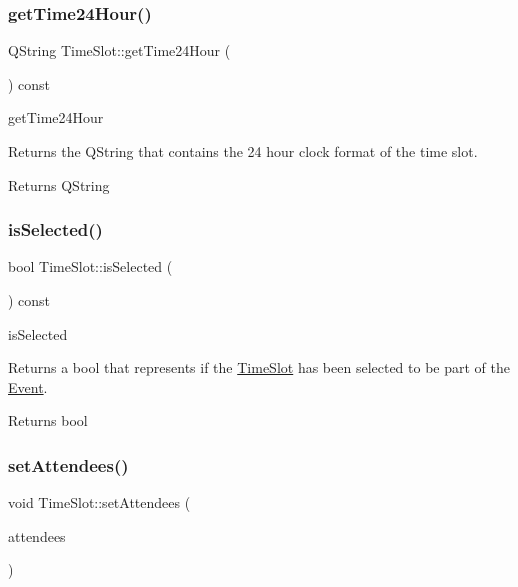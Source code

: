 \subsubsection{\texorpdfstring{get\+Time24\+Hour()}{getTime24Hour()}}
{\footnotesize\ttfamily Q\+String Time\+Slot\+::get\+Time24\+Hour (\begin{DoxyParamCaption}{ }\end{DoxyParamCaption}) const}



get\+Time24\+Hour 

Returns the Q\+String that contains the 24 hour clock format of the time slot. \begin{DoxyReturn}{Returns}
Q\+String 
\end{DoxyReturn}
\mbox{\label{class_time_slot_a7448b6ba71a8b1107dffa98365d593aa}} 
\subsubsection{\texorpdfstring{is\+Selected()}{isSelected()}}
{\footnotesize\ttfamily bool Time\+Slot\+::is\+Selected (\begin{DoxyParamCaption}{ }\end{DoxyParamCaption}) const}



is\+Selected 

Returns a bool that represents if the \hyperlink{class_time_slot}{Time\+Slot} has been selected to be part of the \hyperlink{class_event}{Event}. \begin{DoxyReturn}{Returns}
bool 
\end{DoxyReturn}
\mbox{\label{class_time_slot_a6a28b7702ca5df07ddaf5e25d37b1bd1}} 
\subsubsection{\texorpdfstring{set\+Attendees()}{setAttendees()}}
{\footnotesize\ttfamily void Time\+Slot\+::set\+Attendees (\begin{DoxyParamCaption}\item[{Q\+String\+List}]{attendees }\end{DoxyParamCaption})}



